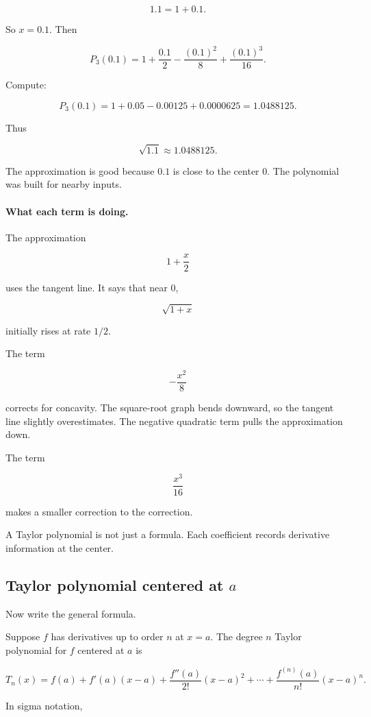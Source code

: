 \[
1.1=1+0.1.
\]

So \(x=0.1\).  Then

\[
P_3(0.1)
=
1+\frac{0.1}{2}-\frac{(0.1)^2}{8}+\frac{(0.1)^3}{16}.
\]

Compute:

\[
P_3(0.1)
=
1+0.05-0.00125+0.0000625
=
1.0488125.
\]

Thus

\[
\boxed{
\sqrt{1.1}\approx 1.0488125.
}
\]

The approximation is good because \(0.1\) is close to the center \(0\).  The polynomial
was built for nearby inputs.

\paragraph{What each term is doing.}
The approximation

\[
1+\frac{x}{2}
\]

uses the tangent line.  It says that near \(0\),

\[
\sqrt{1+x}
\]

initially rises at rate \(1/2\).

The term

\[
-\frac{x^2}{8}
\]

corrects for concavity.  The square-root graph bends downward, so the tangent line
slightly overestimates.  The negative quadratic term pulls the approximation down.

The term

\[
\frac{x^3}{16}
\]

makes a smaller correction to the correction.

A Taylor polynomial is not just a formula.  Each coefficient records derivative
information at the center.

\subsection{Taylor polynomial centered at \texorpdfstring{\(a\)}{a}}
\label{subsec:taylor-polynomial-centered-at-a}

Now write the general formula.

Suppose \(f\) has derivatives up to order \(n\) at \(x=a\).  The degree \(n\) Taylor
polynomial for \(f\) centered at \(a\) is

\[
\boxed{
T_n(x)
=
f(a)
+
f'(a)(x-a)
+
\frac{f''(a)}{2!}(x-a)^2
+
\cdots
+
\frac{f^{(n)}(a)}{n!}(x-a)^n.
}
\]

In sigma notation,

